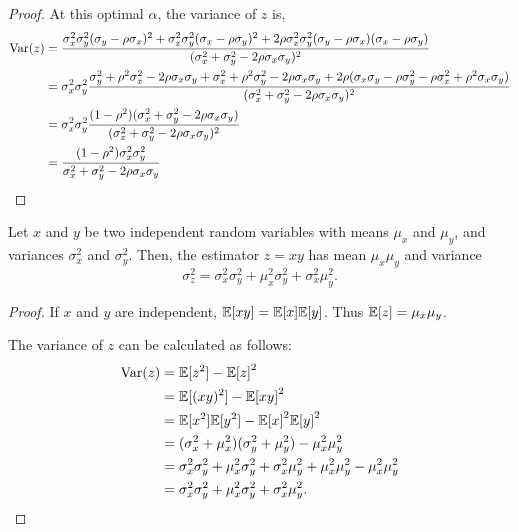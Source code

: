 \begin{proof}
  At this optimal $\alpha$, the variance of $z$ is,
  \begin{align*}
    \text{Var}(z) 
            &= \frac{
            \sigma_x^2 \sigma_y^2 (\sigma_y - \rho \sigma_x)^2
            + \sigma_x^2 \sigma_y^2 (\sigma_x - \rho \sigma_y)^2
            + 2 \rho \sigma_x^2 \sigma_y^2 (\sigma_y - \rho \sigma_x) (\sigma_x - \rho \sigma_y)}{
            (\sigma_x^2 + \sigma_y^2 - 2\rho \sigma_x \sigma_y)^2
            }\\
            &= \sigma_x^2 \sigma_y^2 
            \frac{
             \sigma_y^2 + \rho^2 \sigma_x^2 - 2 \rho \sigma_x \sigma_y 
            + \sigma_x^2 + \rho^2 \sigma_y^2 - 2 \rho \sigma_x \sigma_y 
            + 2 \rho (\sigma_x \sigma_y - \rho \sigma_y^2 - \rho \sigma_x^2 + \rho^2 \sigma_x \sigma_y)}{
            (\sigma_x^2 + \sigma_y^2 - 2\rho \sigma_x \sigma_y)^2
            }\\
            &= \sigma_x^2 \sigma_y^2 
            \frac{
             (1 - \rho^2) (\sigma_x^2 + \sigma_y^2 - 2 \rho \sigma_x \sigma_y)}{
            (\sigma_x^2 + \sigma_y^2 - 2\rho \sigma_x \sigma_y)^2
            }\\
            &= 
            \frac{(1 - \rho^2) \sigma_x^2 \sigma_y^2}{
              \sigma_x^2 + \sigma_y^2 - 2\rho \sigma_x \sigma_y
            }\\
  \end{align*}
\end{proof}

\begin{lemma}
  Let $x$ and $y$ be two independent random variables with means $\mu_x$ and $\mu_y$, and variances $\sigma^2_x$ and $\sigma^2_y$.
  Then, the estimator $z = x y$ has mean $\mu_x \mu_y$ and variance
  $$\sigma^2_z = \sigma_x^2 \sigma_y^2 + \mu_x^2 \sigma_y^2 + \sigma_x^2 \mu_y^2.$$
\end{lemma}
\begin{proof}
  If $x$ and $y$ are independent, $\mathbb{E}[xy] = \mathbb{E}[x]\mathbb{E}[y]$. Thus $\mathbb{E}[z] = \mu_x \mu_y$.

  The variance of $z$ can be calculated as follows:
  \begin{align*}
    \text{Var}(z) &= \mathbb{E}[z^2] - {\mathbb{E}[z]}^2 \\
            &= \mathbb{E}[(xy)^2] - {\mathbb{E}[xy]}^2 \\
            &= \mathbb{E}[x^2] \mathbb{E}[y^2] - {\mathbb{E}[x]}^2 {\mathbb{E}[y]}^2 \\
            &= (\sigma^2_x + \mu_x^2)(\sigma^2_y + \mu_y^2) - \mu_x^2 \mu_y^2 \\
            &= \sigma_x^2 \sigma_y^2 + \mu_x^2 \sigma_y^2 + \sigma_x^2 \mu_y^2 + \mu_x^2 \mu_y^2 - \mu_x^2 \mu_y^2 \\
            &= \sigma_x^2 \sigma_y^2 + \mu_x^2 \sigma_y^2 + \sigma_x^2 \mu_y^2.
  \end{align*}
\end{proof}


